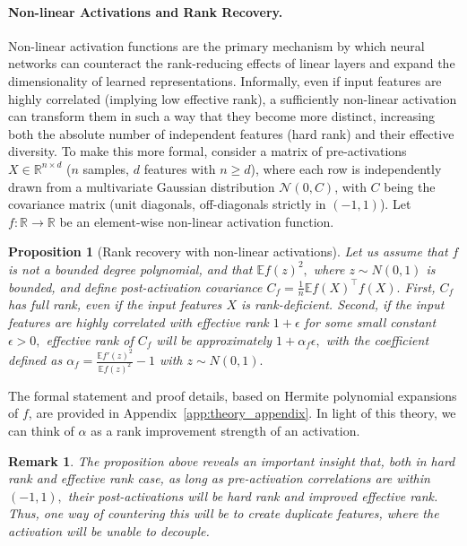 \documentclass{article}
\newcommand{\R}{\mathbb{R}}
\newcommand{\E}{\mathbb{E}}
\newcommand{\ff}[1]{\todo[color=blue!30,size=\tiny]{FF: #1}}
\newtheorem{proposition}{Proposition}[section]
\newtheorem{remark}{Remark}[section]
\numberwithin{figure}{section}
\begin{document}
\paragraph{Non-linear Activations and Rank Recovery.}
Non-linear activation functions are the primary mechanism by which neural networks can counteract the rank-reducing effects of linear layers and expand the dimensionality of learned representations. Informally, even if input features are highly correlated (implying low effective rank), a sufficiently non-linear activation can transform them in such a way that they become more distinct, increasing both the absolute number of independent features (hard rank) and their effective diversity.  
To make this more formal, consider a matrix of pre-activations $X \in \R^{n \times d}$ ($n$ samples, $d$ features with $n\ge d$), where each row is independently drawn from a multivariate Gaussian distribution $\mathcal{N}(0, C)$, with $C$ being the covariance matrix (unit diagonals, off-diagonals strictly in $(-1,1)$). Let $f: \R \to \R$ be an element-wise non-linear activation function.

\begin{proposition}[Rank recovery with non-linear activations]
\label{prop:rank_recovery_informal}
\label{prop:hard_rank_increase_main} %
Let us assume that  $f$ is not a bounded degree polynomial, and that $\E f(z)^2,$ where $z\sim N(0,1)$ is bounded, and define post-activation covariance $C_f = \frac1n \E f(X)^\top f(X).$ First, $C_f$ has full rank, even if the input features $X$ is rank-deficient. Second, if the input features are highly correlated with effective rank $1+\epsilon$ for some small constant $\epsilon>0,$ effective rank of $C_f$ will be approximately  $1 + \alpha_f \epsilon,$ with the coefficient defined as $\alpha_f = \frac{\E f'(z)^2}{\E f(z)^2 } - 1$ with $z\sim N(0,1).$
\end{proposition}
The formal statement and proof details, based on Hermite polynomial expansions of $f$, are provided in Appendix~\ref{app:theory_appendix}. In light of this theory, we can think of $\alpha$ as a rank improvement strength of an activation.

\begin{remark}
\label{rem:duplicate_rank}
    The proposition above reveals an important insight that, both in hard rank and effective rank case, as long as pre-activation correlations are within $(-1,1),$ their post-activations will be hard rank and improved effective rank. Thus, one way of countering this will be to create duplicate features, where the activation will be unable to decouple.
\end{remark}
\end{document}
